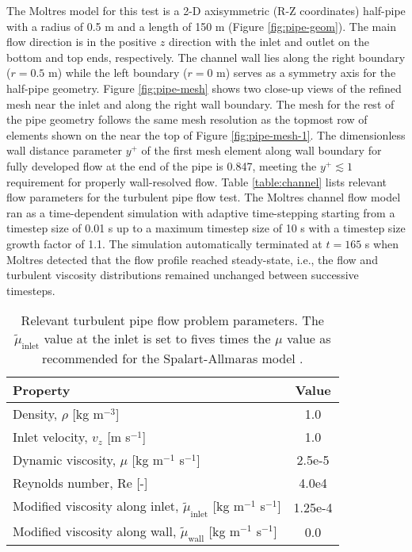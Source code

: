 The Moltres model for this test is a 2-D axisymmetric (R-Z coordinates) half-pipe with a radius of
0.5 m and a length of 150 m (Figure \ref{fig:pipe-geom}). The main flow direction
is in the positive $z$ direction with the inlet and outlet on the bottom and top ends,
respectively. The channel wall lies along the right boundary ($r=0.5$ m) while the left boundary
($r=0$ m) serves as a symmetry axis for the half-pipe geometry. Figure \ref{fig:pipe-mesh} shows
two close-up views of the refined mesh near the inlet and along the right wall boundary. The mesh
for the rest of the pipe geometry follows the same mesh resolution as the topmost row of
elements shown on the near the top of Figure \ref{fig:pipe-mesh-1}. The dimensionless wall distance
parameter $y^+$ of the first mesh element along wall boundary for fully developed flow at the end
of the pipe is 0.847, meeting the
$y^+ \lesssim 1$ requirement for properly wall-resolved flow. Table \ref{table:channel} lists
relevant flow parameters for the turbulent pipe flow test. The Moltres channel flow model ran as a
time-dependent simulation with adaptive time-stepping starting from a timestep size of 0.01
s up to a maximum timestep size of 10 s with a timestep size growth factor of 1.1. The simulation
automatically terminated at $t=165$ s when Moltres detected that the flow profile reached
steady-state, i.e., the flow and turbulent viscosity distributions remained unchanged between
successive timesteps.

\begin{table}[htb]
  \centering
  \small
  \caption{Relevant turbulent pipe flow problem parameters. The $\tilde{\mu}_\text{inlet}$ value
  at the inlet is set to fives times the $\mu$ value as recommended for the Spalart-Allmaras model
  \cite{spalart_one-equation_1994}.}
  \begin{tabular}{l S}
    \toprule
    Property & {Value} \\
    \midrule
    Density, $\rho$ [kg m$^{-3}$] & 1.0 \\
    Inlet velocity, $v_z$ [m s$^{-1}$] & 1.0 \\
    Dynamic viscosity, $\mu$ [kg m$^{-1}$ s$^{-1}$] & 2.5e-5 \\
    Reynolds number, Re [-] & 4.0e4 \\
    Modified viscosity along inlet, $\tilde{\mu}_\text{inlet}$ [kg m$^{-1}$ s$^{-1}$] & 1.25e-4 \\
    Modified viscosity along wall, $\tilde{\mu}_\text{wall}$ [kg m$^{-1}$ s$^{-1}$] & 0.0 \\
    \bottomrule
  \end{tabular}
  \label{table:pipe}
\end{table}

